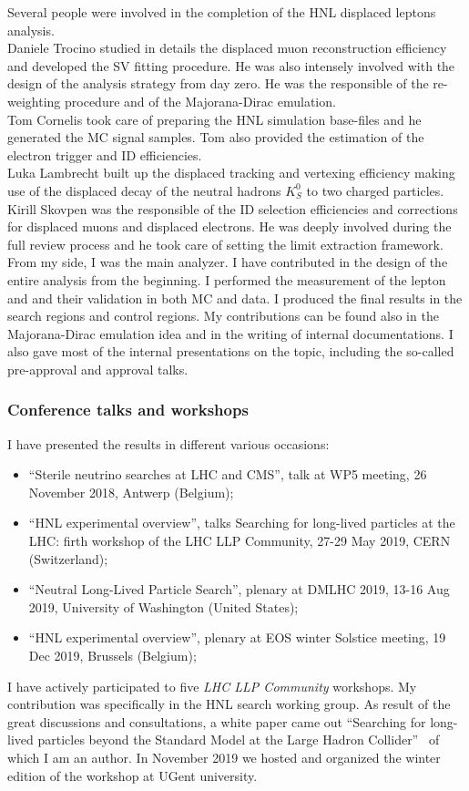 Several people were involved in the completion of the HNL displaced leptons
analysis.\\
Daniele Trocino studied in details the displaced muon reconstruction
efficiency and developed the SV fitting procedure. He was also
intensely involved with the design of the analysis strategy from day zero. He was
the responsible of the re-weighting procedure and of the
Majorana-Dirac emulation.\\
Tom Cornelis took care of preparing the HNL simulation base-files and
he generated the MC signal samples. Tom also provided the estimation
of the electron trigger and ID efficiencies. \\
Luka Lambrecht built up the displaced tracking and vertexing
efficiency making use of the displaced decay of the neutral hadrons $K_S^{0}$ to
two charged particles.\\
Kirill Skovpen was the responsible of the ID selection efficiencies and
corrections for displaced muons and displaced electrons. He was deeply
involved during the full review process and he took care of setting
the limit extraction framework. \\
From my side, I was the main analyzer. I have contributed in the design of the
entire analysis from the beginning. I performed the measurement of the
lepton \fr and \Dfr and their validation in both MC and data. I
produced the final results in the search regions and control
regions. My contributions can be found also in the Majorana-Dirac
emulation idea and in the writing of internal documentations. I also
gave most of the internal presentations on the topic, including the
so-called pre-approval and approval talks.
\subsubsection*{Conference talks and workshops}
I have presented the results in different various occasions:
\begin{itemize}
\item ``Sterile neutrino searches at LHC and CMS'', talk at WP5
  meeting, 26 November 2018, Antwerp (Belgium);
\item ``HNL experimental overview'', talks Searching for long-lived
  particles at the LHC: firth workshop of the LHC LLP Community, 27-29
  May 2019, CERN (Switzerland);
\item ``Neutral Long-Lived Particle Search'', plenary at DM\@ LHC 2019, 13-16 Aug 2019, University of Washington (United States);
\item ``HNL experimental overview'', plenary at EOS winter Solstice
  meeting, 19 Dec 2019, Brussels (Belgium);
\end{itemize}

I have actively participated to five \emph{LHC LLP Community}
workshops. My contribution was specifically in the HNL search working
group. As result of the great discussions and consultations, a white
paper came out ``Searching for long-lived particles beyond the
Standard Model at the Large Hadron Collider''~\cite{Alimena_2020} of
which I am an author. In November 2019 we hosted and organized the winter edition
of the workshop at UGent university.